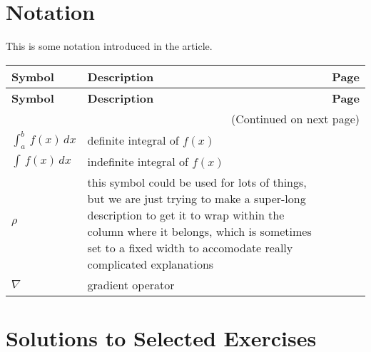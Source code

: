 \documentclass[10pt,]{article}
\theoremstyle{plain}
\theoremstyle{definition}
\theoremstyle{definition}
\theoremstyle{definition}
\theoremstyle{definition}
\theoremstyle{definition}
\theoremstyle{definition}
\numberwithin{equation}{section}
\begin{document}
\section[{Notation}]{Notation}\label{appendix-1}
\hypertarget{p-794}{}%
This is some notation introduced in the article.%
\begin{longtable}[l]{lp{}r}
\textbf{Symbol}&\textbf{Description}&\textbf{Page}\\[1em]
\endfirsthead
\textbf{Symbol}&\textbf{Description}&\textbf{Page}\\[1em]
\endhead
\multicolumn{3}{r}{(Continued on next page)}\\
\endfoot
\endlastfoot
\(\int_a^b\,f(x)\,dx\)&definite integral of \(f(x)\)&\pageref{notation-1}\\
\(\int\,f(x)\,dx\)&indefinite integral of \(f(x)\)&\pageref{notation-2}\\
\(\rho\)&this symbol could be used for lots of things, but we are just trying to make a super-long description to get it to wrap within the column where it belongs, which is sometimes set to a fixed width to accomodate really complicated explanations&\pageref{notation-3}\\
\(\nabla\)&gradient operator&\pageref{notation-4}\\
\end{longtable}
\typeout{************************************************}
\typeout{************************************************}
\section[{Solutions to Selected Exercises}]{Solutions to Selected Exercises}\label{appendix-2}
\end{document}
